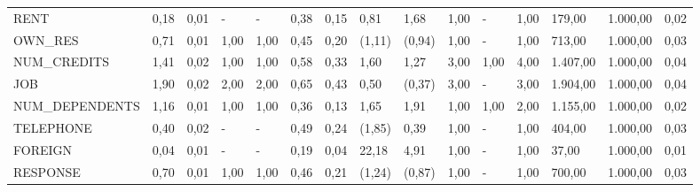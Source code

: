 \begin{table}[]
\begin{tabular}{|l|l|l|l|l|l|l|l|l|l|l|l|l|l|l|}
		{\tiny RENT}& 0,18      & 0,01           & -        & -        & 0,38                                                           & 0,15               & 0,81     & 1,68     & 1,00        & -       & 1,00      & 179,00       & 1.000,00 & 0,02             \\
		{\tiny OWN\_RES}& 0,71      & 0,01           & 1,00     & 1,00     & 0,45                                                           & 0,20               & (1,11)   & (0,94)   & 1,00        & -       & 1,00      & 713,00       & 1.000,00 & 0,03             \\
		{\tiny NUM\_CREDITS}& 1,41      & 0,02           & 1,00     & 1,00     & 0,58                                                           & 0,33               & 1,60     & 1,27     & 3,00        & 1,00    & 4,00      & 1.407,00     & 1.000,00 & 0,04             \\
		{\tiny JOB}& 1,90      & 0,02           & 2,00     & 2,00     & 0,65                                                           & 0,43               & 0,50     & (0,37)   & 3,00        & -       & 3,00      & 1.904,00     & 1.000,00 & 0,04             \\
		{\tiny NUM\_DEPENDENTS}& 1,16      & 0,01           & 1,00     & 1,00     & 0,36                                                           & 0,13               & 1,65     & 1,91     & 1,00        & 1,00    & 2,00      & 1.155,00     & 1.000,00 & 0,02             \\
		{\tiny TELEPHONE}& 0,40      & 0,02           & -        & -        & 0,49                                                           & 0,24               & (1,85)   & 0,39     & 1,00        & -       & 1,00      & 404,00       & 1.000,00 & 0,03             \\
		{\tiny FOREIGN }& 0,04      & 0,01           & -        & -        & 0,19                                                           & 0,04               & 22,18    & 4,91     & 1,00        & -       & 1,00      & 37,00        & 1.000,00 & 0,01             \\
		{\tiny RESPONSE}& 0,70      & 0,01           & 1,00     & 1,00     & 0,46                                                           & 0,21               & (1,24)   & (0,87)   & 1,00        & -       & 1,00      & 700,00       & 1.000,00 & 0,03\\ \hline            
	\end{tabular}
\end{table}

